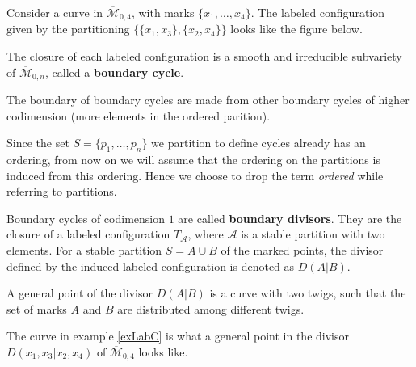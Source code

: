 \begin{example}
    \label{exLabC}
    Consider a curve in $\overline{\mathcal{M}}_{0,4}$, with marks $\{x_{1},\dots, x_{4}\}$. 
    The labeled configuration given by the partitioning $\{\{x_{1}, x_{3}\},\{x_{2}, x_{4}\}\}$ looks like the figure below.
    \begin{center}
    \end{center}
\end{example}

\begin{definition}
    The closure of each labeled configuration is a smooth and irreducible subvariety of $\overline{\mathcal{M}}_{0,n}$, called a \textbf{boundary cycle}.
    \par The boundary of boundary cycles are made from other boundary cycles of higher codimension (more elements in the ordered parition).
\end{definition}

\begin{remark}
    Since the set $S = \{p_{1}, \dots, p_{n}\}$ we partition to define cycles already has an ordering, from now on we will assume that the ordering on the partitions is induced from this ordering. Hence we choose to drop the term \textit{ordered} while referring to partitions.
\end{remark}

\begin{definition}
    Boundary cycles of codimension $1$ are called \textbf{boundary divisors}. 
    They are the closure of a labeled configuration $T_{\mathcal{A}}$, where $\mathcal{A}$ is a stable partition with two elements.
    For a stable partition $S = A \cup B$ of the marked points, the divisor defined by the induced labeled configuration is denoted as $D(A|B)$.
    \par A general point of the divisor $D(A|B)$ is a curve with two twigs, such that the set of marks $A$ and $B$ are distributed among different twigs.
\end{definition}
The curve in example \ref{exLabC} is what a general point in the divisor $D(x_{1},x_{3}|x_{2},x_{4})$ of $\overline{\mathcal{M}}_{0,4}$ looks like.


